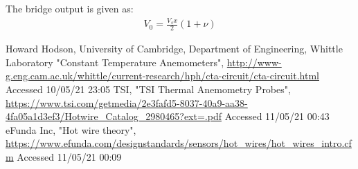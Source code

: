 \documentclass[11pt]{article}
\numberwithin{equation}{section}
\begin{document}
The bridge output is given as:
\begin{align}
    V_0 = \frac{V_s x }{2} \left(1 + \nu\right)
\end{align}
\begin{thebibliography}{00}
     Howard Hodson, University of Cambridge, Department of Engineering, Whittle Laboratory "Constant Temperature Anemometers", \url{http://www-g.eng.cam.ac.uk/whittle/current-research/hph/cta-circuit/cta-circuit.html} Accessed 10/05/21 23:05 
     TSI, "TSI Thermal Anemometry Probes", \url{https://www.tsi.com/getmedia/2e3fafd5-8037-40a9-aa38-4fa05a1d3ef3/Hotwire_Catalog_2980465?ext=.pdf} Accessed 11/05/21 00:43
     eFunda Inc, "Hot wire theory", \url{https://www.efunda.com/designstandards/sensors/hot_wires/hot_wires_intro.cfm} Accessed 11/05/21 00:09
\end{thebibliography}
\end{document}

